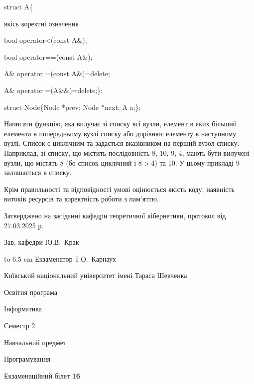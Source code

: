 \documentclass[12pt, ukrainian]{article}
\begin{document}
{struct A\{

\quad  якісь коректні означення 

\quad  bool operator<(const A\&); 

\quad  bool operator==(const A\&); 

\quad A\& operator =(const A\&)=delete; 

\quad  A\& operator =(A\&\&)=delete;\};

struct Node\{Node *prev; Node *next; A a;\};

Написати функцію, яка вилучає зі списку всі вузли, елемент в яких більший елемента в попередньому вузлі списку або дорівнює елементу в наступному вузлі. Список є циклічним та задається вказівником на перший вузол списку. Наприклад, зі списку, що містить послідовність 8, 10, 9, 4, мають бути вилучені вузли, що містять 8 (бо список циклічний і $8>4$) та 10. У цьому прикладі 9 залишається в списку.

Крім правильності та відповідності умові оцінюється якість коду, наявність витоків ресурсів та коректність роботи з пам'яттю. 

}
{\smallskip\smallskip \begin {scriptsize} Затверджено на засіданні кафедри теоретичної кібернетики, протокол   від   27.03.2025 р.\par\smallskip\smallskip\smallskip\smallskip
{\parbox {6.5 cm} {Зав. кафедри \dotfill Ю.В.~Крак}}\hspace {0.7cm} {\hbox to 6.5 cm { Екзаменатор \dotfill Т.О.~Карнаух}} \end{scriptsize}}
\newpage
{{\begin {scriptsize}\par
{ \center  Київський національний університет імені Тараса Шевченка \par}
{\parbox {5 cm}{Освітня програма \hfill}{\parbox {7 cm}{Інформатика\hfill}}\parbox {6 cm}{\hfill Семестр 2}}\par
{\parbox {5 cm} {Навчальний предмет \hfill}\parbox {7 cm}{Програмування \hfill}\parbox {6cm}{\hfill}\par}\vspace{-15pt} \end{scriptsize}}{\center Екзаменаційний білет \No \textbf { 16 }\par}}
\end{document}
